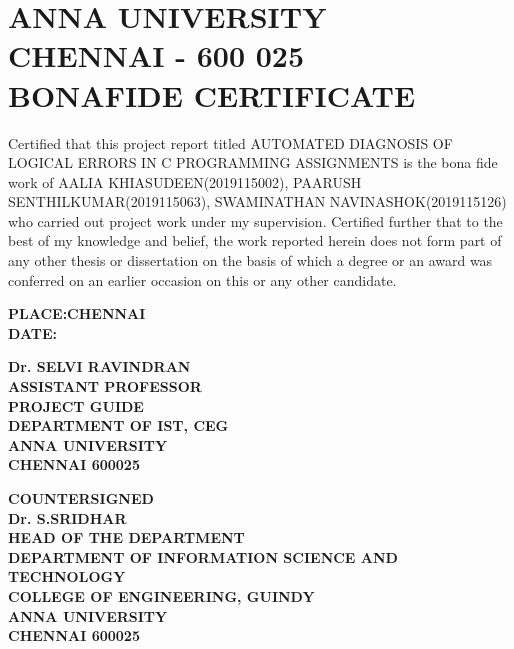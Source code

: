 \documentclass[13 pt,a4paper]{aureportm}
\begin{document}
\chapter*{ANNA UNIVERSITY\\
CHENNAI - 600 025\\
BONAFIDE CERTIFICATE}
\newlength{\aulength}
\settowidth{\aulength}{Anna University
  Chennai}
\newlength{\datewidth}
\settowidth{\datewidth}{Chennai 600 025}

\begin{spacing}{1.5}
  \begin{sloppypar}
  \fontsize{13}{14.5}\selectfont Certified that this project report titled AUTOMATED DIAGNOSIS OF LOGICAL ERRORS IN C PROGRAMMING ASSIGNMENTS is the bona fide work of AALIA KHIASUDEEN(2019115002), PAARUSH SENTHILKUMAR(2019115063), SWAMINATHAN NAVINASHOK(2019115126) who carried out project work under my supervision. Certified further that to the best of my knowledge and belief, the work reported herein does not form part of any other thesis or dissertation on the basis of which a degree or an award was conferred on an earlier occasion on this or any other candidate.
  \end{sloppypar}
\end{spacing}
\vspace{-0.3 cm}
\begin{flushleft}
 \parbox[t]{\datewidth}{\small{\textbf{PLACE:CHENNAI }}\\
 \small{\textbf{DATE: }}}
  \hfill
 \parbox[t]{6 cm}{\small{\textbf{Dr. SELVI RAVINDRAN}} \\
 \small{\textbf{ASSISTANT PROFESSOR}}\\
 \small{\textbf{PROJECT GUIDE}}\\
 \small{\textbf{DEPARTMENT OF IST, CEG}}\\
 \small{\textbf{ANNA UNIVERSITY}}   \\
 \small{\textbf{CHENNAI  600025}}
 }
\end{flushleft}
\begin{center}
 \small{\textbf{COUNTERSIGNED}}\\ 
  \vspace{1.5 cm}
  \textbf{\small{Dr. S.SRIDHAR}}\\ 
  \small{\textbf{HEAD OF THE DEPARTMENT}}\\
 \small{\textbf{DEPARTMENT OF INFORMATION SCIENCE AND TECHNOLOGY}}\\
 \small{\textbf{COLLEGE OF ENGINEERING, GUINDY}}\\
 \small{\textbf{ANNA UNIVERSITY}}   \\
 \small{\textbf{CHENNAI  600025}}
 
\end{center}
\end{document}
